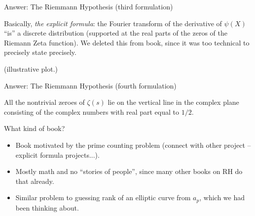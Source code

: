 \documentclass{beamer}
\begin{document}
\begin{frame}{Answer: The Riemmann Hypothesis (third formulation)}
  \begin{block}{}
    Basically, \textit{the explicit formula}: the Fourier transform
    of the derivative of $\psi(X)$ ``is'' a discrete distribution (supported
    at the real parts of the zeros of the Riemann Zeta function).
    We deleted this from book, since it was too technical
    to precisely state precisely.
  \end{block}

  (illustrative plot.)


\end{frame}



\begin{frame}{Answer: The Riemmann Hypothesis (fourth formulation)}
  \begin{block}{}
    All the nontrivial zeroes of $\zeta(s)$ lie on the vertical
    line in the complex plane consisting of the
    complex numbers with real part equal to $1/2$.
  \end{block}
\end{frame}


\begin{frame}{What kind of book?}
  \begin{itemize}
    \item   Book motivated by the prime counting problem (connect with other project -- explicit formula projects...).
    \item Mostly math and no ``stories of people'', since many other books on RH do that already.
    \item Similar problem to guessing rank of an elliptic curve from $a_p$, which we had been thinking about.
  \end{itemize}
\end{frame}
\end{document}
